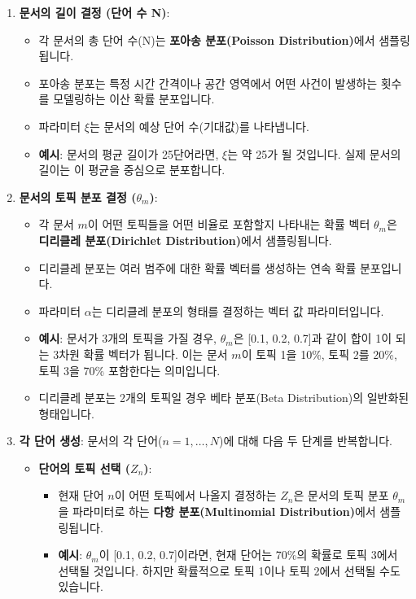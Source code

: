 \documentclass[11pt,a4paper]{article}
\begin{document}
\begin{enumerate}
    \item \textbf{문서의 길이 결정 (단어 수 N)}:
    \begin{itemize}
        \item 각 문서의 총 단어 수(N)는 \textbf{포아송 분포(Poisson Distribution)}에서 샘플링됩니다.
        \item 포아송 분포는 특정 시간 간격이나 공간 영역에서 어떤 사건이 발생하는 횟수를 모델링하는 이산 확률 분포입니다.
        \item 파라미터 $\xi$는 문서의 예상 단어 수(기대값)를 나타냅니다.
        \item \textbf{예시}: 문서의 평균 길이가 25단어라면, $\xi$는 약 25가 될 것입니다. 실제 문서의 길이는 이 평균을 중심으로 분포합니다.
    \end{itemize}
    \item \textbf{문서의 토픽 분포 결정 ($\theta_m$)}:
    \begin{itemize}
        \item 각 문서 $m$이 어떤 토픽들을 어떤 비율로 포함할지 나타내는 확률 벡터 $\theta_m$은 \textbf{디리클레 분포(Dirichlet Distribution)}에서 샘플링됩니다.
        \item 디리클레 분포는 여러 범주에 대한 확률 벡터를 생성하는 연속 확률 분포입니다.
        \item 파라미터 $\alpha$는 디리클레 분포의 형태를 결정하는 벡터 값 파라미터입니다.
        \item \textbf{예시}: 문서가 3개의 토픽을 가질 경우, $\theta_m$은 [0.1, 0.2, 0.7]과 같이 합이 1이 되는 3차원 확률 벡터가 됩니다. 이는 문서 $m$이 토픽 1을 10\%, 토픽 2를 20\%, 토픽 3을 70\% 포함한다는 의미입니다.
        \item 디리클레 분포는 2개의 토픽일 경우 베타 분포(Beta Distribution)의 일반화된 형태입니다.
    \end{itemize}
    \item \textbf{각 단어 생성}: 문서의 각 단어($n=1, \dots, N$)에 대해 다음 두 단계를 반복합니다.
    \begin{itemize}
        \item \textbf{단어의 토픽 선택 ($Z_n$)}:
        \begin{itemize}
            \item 현재 단어 $n$이 어떤 토픽에서 나올지 결정하는 $Z_n$은 문서의 토픽 분포 $\theta_m$을 파라미터로 하는 \textbf{다항 분포(Multinomial Distribution)}에서 샘플링됩니다.
            \item \textbf{예시}: $\theta_m$이 [0.1, 0.2, 0.7]이라면, 현재 단어는 70\%의 확률로 토픽 3에서 선택될 것입니다. 하지만 확률적으로 토픽 1이나 토픽 2에서 선택될 수도 있습니다.

\end{itemize}
\end{itemize}
\end{enumerate}
\end{document}
